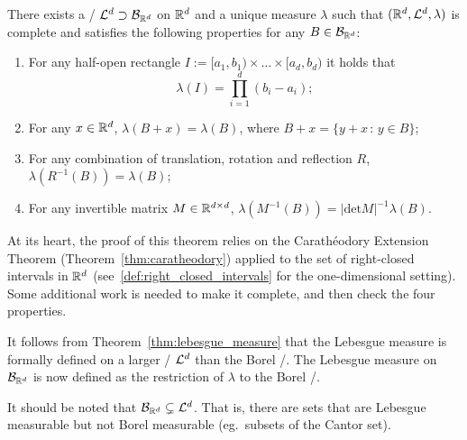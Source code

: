 \begin{theorem}\label{thm:lebesgue_measure}
There exists a \sigalg/ $\mathcal L^d \supset \mathcal B_{\mathbb R^d}$ on $\mathbb R^d$ and a unique measure $\lambda$ such that $(\mathbb R^d, \mathcal L^d, \lambda)$ is complete and satisfies the following properties for any $B \in \mathcal B_{\mathbb R^d}$:
\begin{enumerate}
\item For any half-open rectangle $I := [a_1, b_1) \times \dots \times [a_d, b_d)$ it holds that 
	\[
		\lambda(I) = \prod_{i = 1}^d (b_i-a_i);
	\]
\item For any $x \in \mathbb R^d$, $\lambda(B+x) = \lambda(B)$, where $B + x = \{y+x \, : \, y \in B\}$;
\item For any combination of translation, rotation and reflection $R$, $\lambda(R^{-1}(B)) = \lambda(B)$;
\item For any invertible matrix $M \in \mathbb R^{d \times d}$, $\lambda(M^{-1}(B)) = |\mathrm{det} M|^{-1} \lambda(B)$.
\end{enumerate}
\end{theorem}

At its heart, the proof of this theorem relies on the Carath\'{e}odory Extension Theorem (Theorem~\ref{thm:caratheodory}) applied to the set of right-closed intervals in $\mathbb R^d$ (see~\eqref{def:right_closed_intervals} for the one-dimensional setting). Some additional work is needed to make it complete, and then check the four properties. 

It follows from Theorem~\ref{thm:lebesgue_measure} that the Lebesgue measure is formally defined on a larger \sigalg/ $\mathcal L^d$ than the Borel \sigalg/. 
The Lebesgue measure on $\mathcal B_{\mathbb R^d}$ is now defined as the restriction of $\lambda$ to the Borel \sigalg/. 

\begin{remark}
It should be noted that $\mathcal B_{\mathbb R^d} \subsetneq \mathcal L^d$. That is, there are sets that are Lebesgue measurable but not Borel measurable (eg.\ subsets of the Cantor set).
\end{remark}





